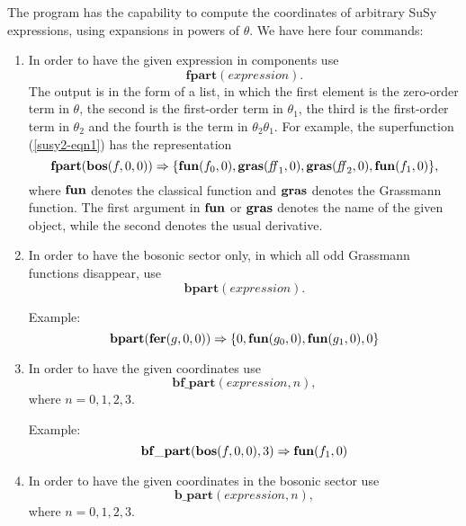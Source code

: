 {The program has the capability to compute the coordinates of arbitrary
SuSy expressions, using expansions in powers of $\theta$.  We have
here four commands:

\begin{enumerate}
\item In order to have the given expression in components use
  \begin{equation*}
    \mathbf{fpart}(\mathit{expression}).
  \end{equation*}
  The output is in the form of a list, in which the first element is
  the zero-order term in $\theta$, the second is the first-order term
  in $\theta_{1}$, the third is the first-order term in $\theta_{2}$
  and the fourth is the term in $\theta_{2}\theta_{1}$.  For example,
  the superfunction (\ref{susy2-eqn1}) has the representation
  \begin{equation*}
    \mathbf{fpart}(\mathbf{bos}(f,0,0)) \Rightarrow
    \{ \mathbf{fun}(f_{0},0), \mathbf{gras}(\mathit{ff}_{1},0),
    \mathbf{gras}(\mathit{ff}_{2},0),\mathbf{fun}(f_{1},0) \},
  \end{equation*}
  where $\mathbf{fun}$ denotes the classical function and
  $\mathbf{gras}$ denotes the Grassmann function.  The first argument
  in $\mathbf{fun}$ or $\mathbf{gras}$ denotes the name of the given
  object, while the second denotes the usual derivative.

\item In order to have the bosonic sector only, in which all odd
  Grassmann functions disappear, use
  \begin{equation*}
    \mathbf{bpart}(\mathit{expression}).
  \end{equation*}

  Example:
  \begin{equation*}
    \mathbf{bpart}(\mathbf{fer}(g,0,0)) \Rightarrow
    \{0, \mathbf{fun}(g_{0},0), \mathbf{fun}(g_{1},0), 0\}
  \end{equation*}

\item In order to have the given coordinates use
  \begin{equation*}
    \mathbf{bf\_part}(\mathit{expression},n),
  \end{equation*}
  where $n=0,1,2,3$.

  Example:
  \begin{equation*}
    \mathbf{bf\_part}(\mathbf{bos}(f,0,0),3) \Rightarrow \mathbf{fun}(f_{1},0)
  \end{equation*}

\item In order to have the given coordinates in the bosonic
  sector use
  \begin{equation*}
    \mathbf{b\_part}(\mathit{expression},n),
  \end{equation*}
  where $n=0,1,2,3$.


\end{enumerate}}
